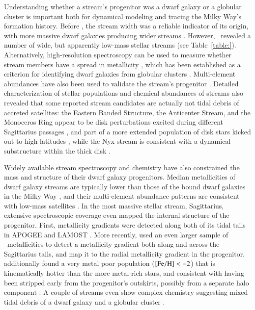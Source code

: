 \documentclass[final,5p,times,twocolumn,authoryear]{elsarticle}
\begin{document}
Understanding whether a stream's progenitor was a dwarf galaxy or a globular cluster is important both for dynamical modeling and tracing the Milky Way's formation history.
Before \gaia, the stream width was a reliable indicator of its origin, with more massive dwarf galaxies producing wider streams \citep[e.g.,][]{Belokurov:2006, bonaca:2012}.
However, \gaia\ revealed a number of wide, but apparently low-mass stellar streams (see Table~\ref{table:}).
Alternatively, high-resolution spectroscopy can be used to measure whether stream members have a spread in metallicity \citep[e.g.,][]{ji:2020,chandra:2022}, which has been established as a criterion for identifying dwarf galaxies from globular clusters \citep{willman:2012}.
Multi-element abundances have also been used to validate the stream's progenitor \citep[e.g., NGC~3201 as the progenitor of the Gj\" ol stream,][]{hansen:2020}.
Detailed characterization of stellar populations and chemical abundances of streams also revealed that some reported stream candidates are actually not tidal debris of accreted satellites: the Eastern Banded Structure, the Anticenter Stream, and the Monoceros Ring appear to be disk perturbations excited during different Sagittarius passages \citep[cf.][]{deason:2018, laporte:2020}, and part of a more extended population of disk stars kicked out to high latitudes \citep{price-whelan:2015,bergemann:2018,laporte:2018}, while the Nyx stream is consistent with a dynamical substructure within the thick disk \citep[cf.][]{zucker:2021,wang:2023}.

Widely available stream spectroscopy and chemistry have also constrained the mass and structure of their dwarf galaxy progenitors.
Median metallicities of dwarf galaxy streams are typically lower than those of the bound dwarf galaxies in the Milky Way \citep{li:2022}, and their multi-element abundance patterns are consistent with low-mass satellites \citep[$\approx10^6\,\unit{\msun}$,][]{ji:2020,hawkins:2023}.
In the most massive stellar stream, Sagittarius, extensive spectroscopic coverage even mapped the internal structure of the progenitor.
First, metallicity gradients were detected along both of its tidal tails in APOGEE \citep{hayes:2020} and LAMOST \citep{zhao:2020}.
More recently, \citet{cunningham:2024} used an even larger sample of \gaia\ metallicities \citep{andrae:2023} to detect a metallicity gradient both along and across the Sagittarius tails, and map it to the radial metallicity gradient in the progenitor.
\citet{johnson:2020} additionally found a very metal poor population (${[\mathrm{Fe}/\mathrm{H}]}<-2$) that is kinematically hotter than the more metal-rich stars, and consistent with having been stripped early from the progenitor's outskirts, possibly from a separate halo component \citep[see also][]{limberg:2023}.
A couple of streams even show complex chemistry suggesting mixed tidal debris of a dwarf galaxy and a globular cluster \citep{hansen:2021,limberg:2024}.
\end{document}
